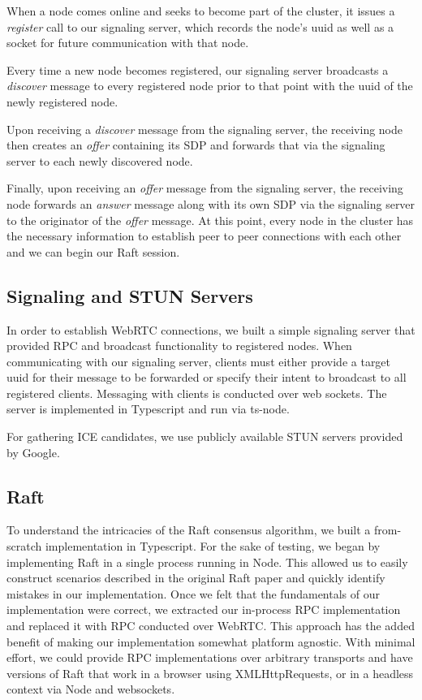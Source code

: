 \documentclass[11pt,twocolumn]{article}
\begin{document}
When a node comes online and seeks to become part of the cluster, it issues a \textit{register} call to our signaling server, which records the node's uuid as well as a socket for future communication with that node.

Every time a new node becomes registered, our signaling server broadcasts a \textit{discover} message to every registered node prior to that point with the uuid of the newly registered node.

Upon receiving a \textit{discover} message from the signaling server, the receiving node then creates an \textit{offer} containing its SDP and forwards that via the signaling server to each newly discovered node.

Finally, upon receiving an \textit{offer} message from the signaling server, the receiving node forwards an \textit{answer} message along with its own SDP via the signaling server to the originator of the \textit{offer} message. At this point, every node in the cluster has the necessary information to establish peer to peer connections with each other and we can begin our Raft session.


\subsection{Signaling and STUN Servers}
In order to establish WebRTC connections, we built a simple signaling server that provided RPC and broadcast functionality to registered nodes. When communicating with our signaling server, clients must either provide a target uuid for their message to be forwarded or specify their intent to broadcast to all registered clients. Messaging with clients is conducted over web sockets. The server is implemented in Typescript and run via ts-node.

For gathering ICE candidates, we use publicly available STUN servers provided by Google.

\subsection{Raft}
To understand the intricacies of the Raft consensus algorithm, we built a from-scratch implementation in Typescript. For the sake of testing, we began by implementing Raft in a single process running in Node. This allowed us to easily construct scenarios described in the original Raft paper and quickly identify mistakes in our implementation. Once we felt that the fundamentals of our implementation were correct, we extracted our in-process RPC implementation and replaced it with RPC conducted over WebRTC. This approach has the added benefit of making our implementation somewhat platform agnostic. With minimal effort, we could provide RPC implementations over arbitrary transports and have versions of Raft that work in a browser using XMLHttpRequests, or in a headless context via Node and websockets.
\end{document}
